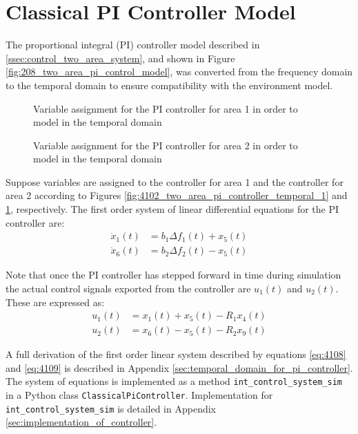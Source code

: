 \section{Classical PI Controller Model}
The proportional integral (PI) controller model described in \textsection \ref{ssec:control_two_area_system}, and shown in Figure \ref{fig:208_two_area_pi_control_model}, was converted from the frequency domain to the temporal domain to ensure compatibility with the environment model.

\begin{figure}[h]
	\begin{minipage}[b]{0.5\textwidth}
		\resizebox{7.0cm}{!}{}
		\caption[Area 1 PI controller ODE derivation]{Variable assignment for the PI controller for area 1 in order to model in the temporal domain}
		\label{fig:4102_two_area_pi_controller_temporal_1}
	\end{minipage}
	\hspace{0.1cm}
	\begin{minipage}[b]{0.5\textwidth}
		\resizebox{7.2cm}{!}{}
		\caption[Area 2 PI controller ODE derivation]{Variable assignment for the PI controller for area 2 in order to model in the temporal domain}
		\label{fig:4103_two_area_pi_controller_temporal_2}
	\end{minipage}
\end{figure}

Suppose variables are assigned to the controller for area 1 and the controller for area 2 according to Figures \ref{fig:4102_two_area_pi_controller_temporal_1} and \ref{fig:4103_two_area_pi_controller_temporal_2}, respectively. The first order system of linear differential equations for the PI controller are:
\begin{align}
	\dot{x}_1(t) &= b_1 \Delta f_1(t) + x_5(t) \label{eq:4108} \\
	\dot{x}_6(t) &= b_2 \Delta f_2(t) - x_5(t) \label{eq:4109}
\end{align}

Note that once the PI controller has stepped forward in time during simulation the actual control signals exported from the controller are $u_1(t)$ and $u_2(t)$. These are expressed as:
\begin{align}
	u_1(t) &= x_1(t) + x_5(t) - R_1 x_4(t) \\
	u_2(t) &= x_6(t) - x_5(t) - R_2 x_9(t) 
\end{align}

A full derivation of the first order linear system described by equations \ref{eq:4108} and \ref{eq:4109} is described in Appendix \ref{sec:temporal_domain_for_pi_controller}. The system of equations is implemented as a method \verb|int_control_system_sim| in a Python class \verb|ClassicalPiController|. Implementation for \verb|int_control_system_sim| is detailed in Appendix \ref{sec:implementation_of_controller}.